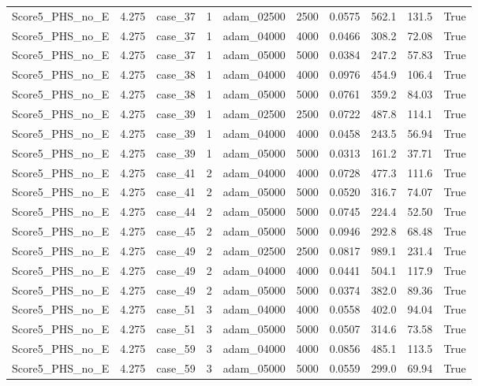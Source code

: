 \begin{longtable}{llllllllll}
Score5\_PHS\_no\_E & 4.275 & case\_37 & 1 & adam\_02500 & 2500 & 0.0575 & 562.1 & 131.5 & True \\
Score5\_PHS\_no\_E & 4.275 & case\_37 & 1 & adam\_04000 & 4000 & 0.0466 & 308.2 & 72.08 & True \\
Score5\_PHS\_no\_E & 4.275 & case\_37 & 1 & adam\_05000 & 5000 & 0.0384 & 247.2 & 57.83 & True \\
Score5\_PHS\_no\_E & 4.275 & case\_38 & 1 & adam\_04000 & 4000 & 0.0976 & 454.9 & 106.4 & True \\
Score5\_PHS\_no\_E & 4.275 & case\_38 & 1 & adam\_05000 & 5000 & 0.0761 & 359.2 & 84.03 & True \\
Score5\_PHS\_no\_E & 4.275 & case\_39 & 1 & adam\_02500 & 2500 & 0.0722 & 487.8 & 114.1 & True \\
Score5\_PHS\_no\_E & 4.275 & case\_39 & 1 & adam\_04000 & 4000 & 0.0458 & 243.5 & 56.94 & True \\
Score5\_PHS\_no\_E & 4.275 & case\_39 & 1 & adam\_05000 & 5000 & 0.0313 & 161.2 & 37.71 & True \\
Score5\_PHS\_no\_E & 4.275 & case\_41 & 2 & adam\_04000 & 4000 & 0.0728 & 477.3 & 111.6 & True \\
Score5\_PHS\_no\_E & 4.275 & case\_41 & 2 & adam\_05000 & 5000 & 0.0520 & 316.7 & 74.07 & True \\
Score5\_PHS\_no\_E & 4.275 & case\_44 & 2 & adam\_05000 & 5000 & 0.0745 & 224.4 & 52.50 & True \\
Score5\_PHS\_no\_E & 4.275 & case\_45 & 2 & adam\_05000 & 5000 & 0.0946 & 292.8 & 68.48 & True \\
Score5\_PHS\_no\_E & 4.275 & case\_49 & 2 & adam\_02500 & 2500 & 0.0817 & 989.1 & 231.4 & True \\
Score5\_PHS\_no\_E & 4.275 & case\_49 & 2 & adam\_04000 & 4000 & 0.0441 & 504.1 & 117.9 & True \\
Score5\_PHS\_no\_E & 4.275 & case\_49 & 2 & adam\_05000 & 5000 & 0.0374 & 382.0 & 89.36 & True \\
Score5\_PHS\_no\_E & 4.275 & case\_51 & 3 & adam\_04000 & 4000 & 0.0558 & 402.0 & 94.04 & True \\
Score5\_PHS\_no\_E & 4.275 & case\_51 & 3 & adam\_05000 & 5000 & 0.0507 & 314.6 & 73.58 & True \\
Score5\_PHS\_no\_E & 4.275 & case\_59 & 3 & adam\_04000 & 4000 & 0.0856 & 485.1 & 113.5 & True \\
Score5\_PHS\_no\_E & 4.275 & case\_59 & 3 & adam\_05000 & 5000 & 0.0559 & 299.0 & 69.94 & True \\
\end{longtable}
